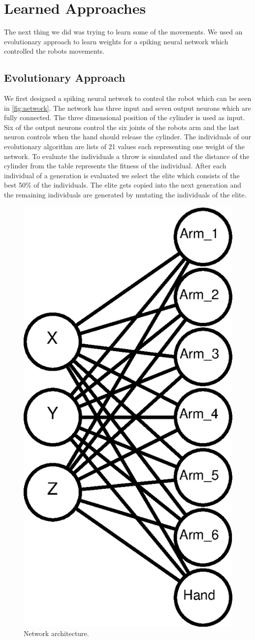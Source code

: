\section{Learned Approaches}
\label{sec:learned}
The next thing we did was trying to learn some of the movements.
We used an evolutionary approach to learn weights for a spiking neural network which controlled the robots movements.

\subsection{Evolutionary Approach}
We first designed a spiking neural network to control the robot which can be seen in \autoref{fig:network}.
The network has three input and seven output neurons which are fully connected.
The three dimensional position of the cylinder is used as input.
Six of the output neurons control the six joints of the robots arm and the last neuron controls when the hand should release the cylinder.
The individuals of our evolutionary algorithm are lists of 21 values each representing one weight of the network.
To evaluate the individuals a throw is simulated and the distance of the cylinder from the table represents the fitness of the individual.
After each individual of a generation is evaluated we select the elite which consists of the best 50\% of the individuals.
The elite gets copied into the next generation and the remaining individuals are generated by mutating the individuals of the elite.

\begin{figure}[h]
\centering
\includegraphics[width=.5\columnwidth]{figures/net.eps}
\caption{Network architecture.}
\label{fig:network}
\end{figure}

